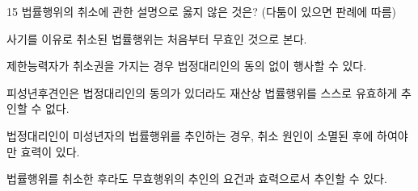 \begin{question}{15}
법률행위의 취소에 관한 설명으로 옳지 않은 것은? (다툼이 있으면 판례에 따름)
\begin{choices}
  \item 사기를 이유로 취소된 법률행위는 처음부터 무효인 것으로 본다.
  \item 제한능력자가 취소권을 가지는 경우 법정대리인의 동의 없이 행사할 수 있다.
  \item 피성년후견인은 법정대리인의 동의가 있더라도 재산상 법률행위를 스스로 유효하게 추인할 수 없다.
  \item 법정대리인이 미성년자의 법률행위를 추인하는 경우, 취소 원인이 소멸된 후에 하여야만 효력이 있다.
  \item 법률행위를 취소한 후라도 무효행위의 추인의 요건과 효력으로서 추인할 수 있다.
\end{choices}
\end{question}
